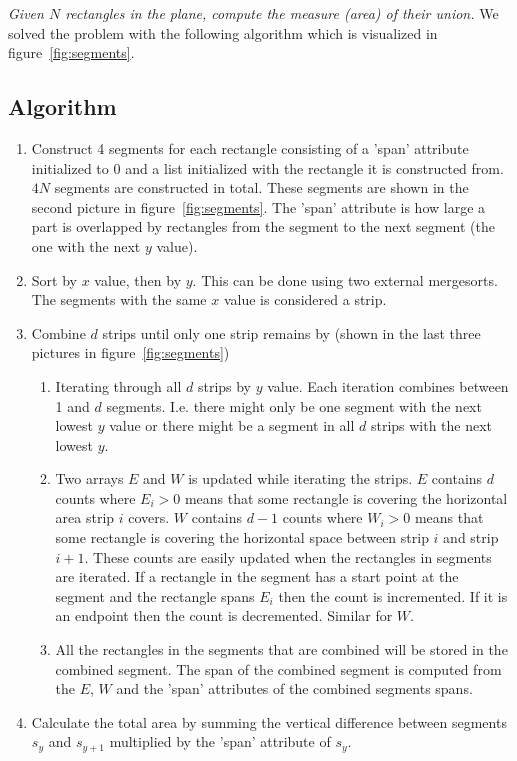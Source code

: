 \emph{Given $N$ rectangles in the plane, compute the measure (area) of their union.} We solved the problem with the following algorithm which is visualized in figure~\ref{fig:segments}.

\subsection{Algorithm}

\begin{enumerate}
\item \label{enu:segments} Construct 4 segments for each rectangle consisting of a 'span' attribute initialized to 0 and a list initialized with the rectangle it is constructed from. $4N$ segments are constructed in total. These segments are shown in the second picture in figure~\ref{fig:segments}. The 'span' attribute is how large a part is overlapped by rectangles from the segment to the next segment (the one with the next $y$ value).
\item \label{enu:sorting} Sort by $x$ value, then by $y$. This can be done using two external mergesorts. The segments with the same $x$ value is considered a strip.
\item \label{enum:combine} Combine $d$ strips until only one strip remains by (shown in the last three pictures in figure~\ref{fig:segments})
    \begin{enumerate}
        \item Iterating through all $d$ strips by $y$ value. Each iteration combines between 1 and $d$ segments. I.e. there might only be one segment with the next lowest $y$ value or there might be a segment in all $d$ strips with the next lowest $y$.
        \item Two arrays $E$ and $W$ is updated while iterating the strips. $E$ contains $d$ counts where $E_i>0$ means that some rectangle is covering the horizontal area strip $i$ covers. $W$ contains $d-1$ counts where $W_i>0$ means that some rectangle is covering the horizontal space between strip $i$ and strip $i+1$. These counts are easily updated when the rectangles in segments are iterated. If a rectangle in the segment has a start point at the segment and the rectangle spans $E_i$ then the count is incremented. If it is an endpoint then the count is decremented. Similar for $W$.
        \item All the rectangles in the segments that are combined will be stored in the combined segment. The span of the combined segment is computed from the $E$, $W$ and the 'span' attributes of the combined segments spans.
    \end{enumerate}
\item \label{enu:calculate} Calculate the total area by summing the vertical difference between segments $s_{y}$ and $s_{y+1}$ multiplied by the 'span' attribute of $s_{y}$.
\end{enumerate}

